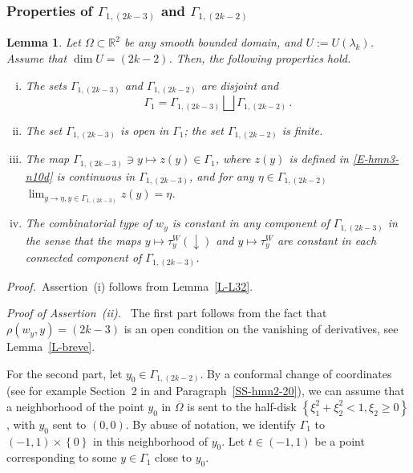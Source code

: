 \documentclass[12pt,a4paper]{amsart}
\theoremstyle{plain} %
\newtheorem{lemma}[theorem]{Lemma}
\theoremstyle{definition}
\numberwithin{equation}{section}
\numberwithin{figure}{section}
\numberwithin{table}{section}
\newcommand{\R}{\mathbb{R}}
\newcommand{\pf}{\emph{Proof.~}}
\newcommand{\set}[1]{\left\lbrace #1 \right\rbrace}
\begin{document}
\subsubsection{Properties of $\Gamma_{1,(2k-3)}$ and $\Gamma_{1,(2k-2)}$}\label{SSS-hmn-31bc}

\begin{lemma}\label{L-L33}
Let $\Omega \subset \R^2$ be any smooth bounded domain, and $U := U(\lambda_k)$. Assume that $\dim U = (2k-2)$. Then, the following properties hold.
\begin{enumerate}[(i)]
  \item The sets $\Gamma_{1,(2k-3)}$ and $\Gamma_{1,(2k-2)}$ are disjoint and
      $$\Gamma_1 = \Gamma_{1,(2k-3)} \bigsqcup \Gamma_{1,(2k-2)}\,.$$
  \item The set $\Gamma_{1,(2k-3)}$ is open in $\Gamma_1$; the set $\Gamma_{1,(2k-2)}$ is finite.
  \item The map $\Gamma_{1,(2k -3)} \ni y \mapsto z(y) \in \Gamma_1$, where $z(y)$ is defined in \eqref{E-hmn3-n10d} is continuous in $\Gamma_{1,(2k -3)}$, and  for any $\eta \in \Gamma_{1,(2k -2)}$ $\lim_{y \to \eta, y \in \Gamma_{1,(2k-3)}}z(y) = \eta$.
  \item   The  combinatorial type of $w_y$ is constant in any component of $\Gamma_{1,(2k-3)}$ in the sense that the maps $y \mapsto \tau_{y}^{W}(\downarrow)$ and $y \mapsto \tau_{y}^{W}$ are constant in each connected component of $\Gamma_{1,(2k-3)}$.
\end{enumerate}
\end{lemma}%


\pf Assertion~(i) follows from Lemma~\ref{L-L32}. \medskip

\emph{Proof of Assertion~(ii).~} The first part follows from the fact that $\rho(w_y,y) = (2k -3)$ is an open condition on the vanishing of derivatives,  see Lemma~\ref{L-breve}. \smallskip

For the second part, let $y_0 \in \Gamma_{1,(2k -2)}$. By a conformal change of coordinates (see for example Section~2 in \cite{YaZh2021} and Paragraph~\ref{SS-hmn2-20}), we can assume that a neighborhood of the point $y_0$ in $\overline{\Omega}$ is sent to the half-disk $\set{\xi_1^2+\xi_2^2 < 1, \xi_2\ge 0}$, with $y_0$ sent to $(0,0)$.  By abuse of notation, we identify $\Gamma_1$ to $(-1,1)\times\set{0}$ in this neighborhood of $y_0$. Let $t \in (-1,1)$ be a point corresponding  to some $y \in \Gamma_{1}$ close to $y_0$.\smallskip
\end{document}
